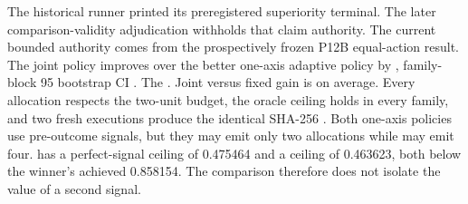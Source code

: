\markdownRendererDocumentBegin
\markdownRendererSectionBegin
{}\markdownRendererInterblockSeparator
{}The historical runner printed its preregistered superiority terminal. The later comparison-validity adjudication withholds that claim authority. The current bounded authority comes from the prospectively frozen P12B equal-action result.\markdownRendererInterblockSeparator
{}\markdownRendererInterblockSeparator
{}The joint policy improves over the better one-axis adaptive policy by , family-block 95\markdownRendererPercentSign{} bootstrap CI \markdownRendererStrongEmphasis{\markdownRendererCodeSpan{[0.286008, 0.382693]}}.\markdownRendererInterblockSeparator
{}The . Joint versus fixed  gain is  on average. Every allocation respects the two-unit budget, the oracle ceiling holds in every family, and two fresh executions produce the identical SHA-256\markdownRendererInterblockSeparator
{}.\markdownRendererInterblockSeparator
{}\markdownRendererSectionBegin
{}\markdownRendererInterblockSeparator
{}Both one-axis policies use pre-outcome signals, but they may emit only two allocations while  may emit four.  has a perfect-signal ceiling of 0.475464 and  a ceiling of 0.463623, both below the winner's achieved 0.858154. The comparison therefore does not isolate the value of a second signal.\markdownRendererInterblockSeparator
{}
\markdownRendererSectionEnd \markdownRendererSectionBegin
